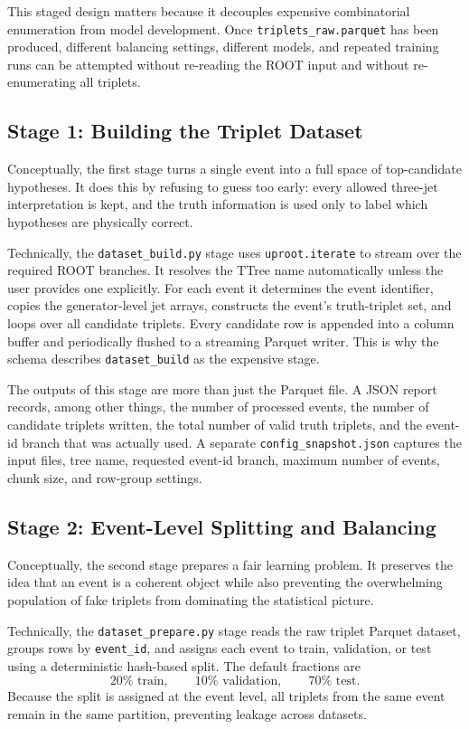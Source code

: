 \documentclass[11pt]{article}
\begin{document}
This staged design matters because it decouples expensive combinatorial enumeration from model development. Once \texttt{triplets\_raw.parquet} has been produced, different balancing settings, different models, and repeated training runs can be attempted without re-reading the ROOT input and without re-enumerating all triplets.

\subsection{Stage 1: Building the Triplet Dataset}

Conceptually, the first stage turns a single event into a full space of top-candidate hypotheses. It does this by refusing to guess too early: every allowed three-jet interpretation is kept, and the truth information is used only to label which hypotheses are physically correct.

Technically, the \texttt{dataset\_build.py} stage uses \texttt{uproot.iterate} to stream over the required ROOT branches. It resolves the TTree name automatically unless the user provides one explicitly. For each event it determines the event identifier, copies the generator-level jet arrays, constructs the event's truth-triplet set, and loops over all candidate triplets. Every candidate row is appended into a column buffer and periodically flushed to a streaming Parquet writer. This is why the schema describes \texttt{dataset\_build} as the expensive stage.

The outputs of this stage are more than just the Parquet file. A JSON report records, among other things, the number of processed events, the number of candidate triplets written, the total number of valid truth triplets, and the event-id branch that was actually used. A separate \texttt{config\_snapshot.json} captures the input files, tree name, requested event-id branch, maximum number of events, chunk size, and row-group settings.

\subsection{Stage 2: Event-Level Splitting and Balancing}

Conceptually, the second stage prepares a fair learning problem. It preserves the idea that an event is a coherent object while also preventing the overwhelming population of fake triplets from dominating the statistical picture.

Technically, the \texttt{dataset\_prepare.py} stage reads the raw triplet Parquet dataset, groups rows by \texttt{event\_id}, and assigns each event to train, validation, or test using a deterministic hash-based split. The default fractions are
\[
20\% \text{ train}, \qquad 10\% \text{ validation}, \qquad 70\% \text{ test}.
\]
Because the split is assigned at the event level, all triplets from the same event remain in the same partition, preventing leakage across datasets.
\end{document}
